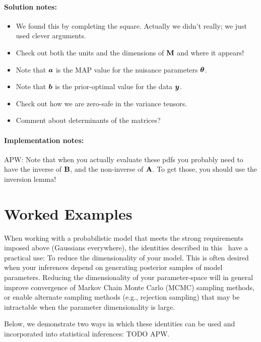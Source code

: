 \paragraph{Solution notes:}
\begin{itemize}
\item
We found this by completing the square. Actually we didn't really; we just
used clever arguments.
\item
Check out both the units and the dimensions of $\mathbf{M}$ and where it appears!
\item
Note that $\boldsymbol{a}$ is the MAP value for the nuisance parameters $\boldsymbol{\theta}$.
\item
Note that $\boldsymbol{b}$ is the prior-optimal value for the data $\boldsymbol{y}$.
\item
Check out how we are zero-safe in the variance tensors.
\item
Comment about determinants of the matrices?
\end{itemize}

\paragraph{Implementation notes:}
APW: Note that when you actually evaluate these pdfs you probably need to have the
inverse of $\mathbf{B}$, and the non-inverse of $\mathbf{A}$.
To get those, you should use the inversion lemma!


\section{Worked Examples}

When working with a probabilistic model that meets the strong requirements
imposed above (Gaussians everywhere), the identities described in this
\documentname\ have a practical use: To reduce the dimensionality of your model.
This is often desired when your inferences depend on generating posterior
samples of model parameters.
Reducing the dimensionality of your parameter-space will in general improve
convergence of Markov Chain Monte Carlo (MCMC) sampling methods, or enable
alternate sampling methods (e.g., rejection sampling) that may be intractable
when the parameter dimensionality is large.

Below, we demonstrate two ways in which these identities can be used and
incorporated into statistical inferences: TODO APW.

